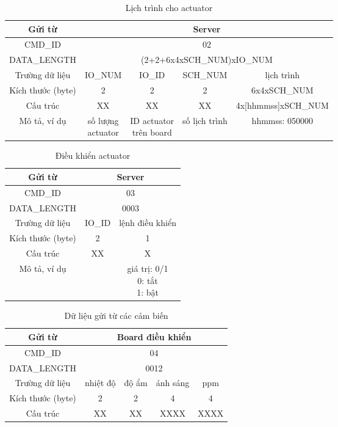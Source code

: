 \documentclass[a4paper,12pt,oneside]{article}
\begin{document}
\begin{table}[!htp]
\centering
\begin{tabular}{|c|c|c|c|c|}
\hline 
Gửi từ & \multicolumn{4}{c|}{Server} \\ 
\hline 
CMD\_ID & \multicolumn{4}{c|}{02} \\ 
\hline 
DATA\_LENGTH & \multicolumn{4}{c|}{(2+2+6x4xSCH\_NUM)xIO\_NUM}\\ 
\hline 
Trường dữ liệu & IO\_NUM & IO\_ID & SCH\_NUM & lịch trình \\ 
\hline 
Kích thước (byte) & 2 & 2 & 2 & 6x4xSCH\_NUM \\ 
\hline 
Cấu trúc & XX & XX & XX & 4x[hhmmss]xSCH\_NUM \\ 
\hline 
Mô tả, ví dụ & \makecell{số lượng \\actuator} & \makecell{ID actuator \\ trên board} & số lịch trình & hhmmss: 050000 \\ 
\hline 
\end{tabular} 
\caption{Lịch trình cho actuator}
\end{table}

\begin{table}[!htp]
\centering
\begin{tabular}{|c|c|c|}
\hline 
Gửi từ & \multicolumn{2}{c|}{Server} \\ 
\hline 
CMD\_ID & \multicolumn{2}{c|}{03} \\ 
\hline 
DATA\_LENGTH & \multicolumn{2}{c|}{0003} \\ 
\hline 
Trường dữ liệu & IO\_ID & lệnh điều khiển \\ 
\hline 
Kích thước (byte) & 2 & 1 \\ 
\hline 
Cấu trúc & XX & X \\ 
\hline 
Mô tả, ví dụ &  & \makecell{giá trị: 0/1 \\ 0: tắt \\ 1: bật} \\ 
\hline 
\end{tabular} 
\caption{Điều khiển actuator}
\end{table}

\begin{table}[!htp]
\centering
\begin{tabular}{|c|c|c|c|c|}
\hline 
Gửi từ & \multicolumn{4}{c|}{Board điều khiển} \\ 
\hline 
CMD\_ID & \multicolumn{4}{c|}{04} \\ 
\hline 
DATA\_LENGTH & \multicolumn{4}{c|}{0012} \\ 
\hline 
Trường dữ liệu & nhiệt độ & độ ẩm & ánh sáng & ppm \\ 
\hline 
Kích thước (byte) & 2 & 2 & 4 & 4 \\ 
\hline 
Cấu trúc & XX & XX & XXXX & XXXX \\ 
\hline 
\end{tabular} 
\caption{Dữ liệu gửi từ các cảm biến}
\end{table}
\end{document}
